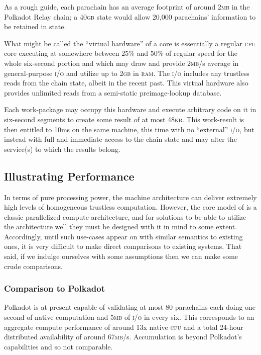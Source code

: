 As a rough guide, each parachain has an average footprint of around 2\textsc{mb} in the Polkadot Relay chain; a 40\textsc{gb} state would allow 20,000 parachains' information to be retained in state.

What might be called the ``virtual hardware'' of a \Jam core is essentially a regular \textsc{cpu} core executing at somewhere between 25\% and 50\% of regular speed for the whole six-second portion and which may draw and provide 2\textsc{mb}/s average in general-purpose \textsc{i/o} and utilize up to 2\textsc{gb} in \textsc{ram}. The \textsc{i/o} includes any trustless reads from the \Jam chain state, albeit in the recent past. This virtual hardware also provides unlimited reads from a semi-static preimage-lookup database.

Each work-package may occupy this hardware and execute arbitrary code on it in six-second segments to create some result of at most 48\textsc{kb}. This work-result is then entitled to 10ms on the same machine, this time with no ``external'' \textsc{i/o}, but instead with full and immediate access to the \Jam chain state and may alter the service(s) to which the results belong.

\subsection{Illustrating Performance}

In terms of pure processing power, the \Jam machine architecture can deliver extremely high levels of homogeneous trustless computation. However, the core model of \Jam is a classic parallelized compute architecture, and for solutions to be able to utilize the architecture well they must be designed with it in mind to some extent. Accordingly, until such use-cases appear on \Jam with similar semantics to existing ones, it is very difficult to make direct comparisons to existing systems. That said, if we indulge ourselves with some assumptions then we can make some crude comparisons.

\subsubsection{Comparison to Polkadot}
Polkadot is at present capable of validating at most 80 parachains each doing one second of native computation and 5\textsc{mb} of \textsc{i/o} in every six. This corresponds to an aggregate compute performance of around 13x native \textsc{cpu} and a total 24-hour distributed availability of around 67\textsc{mb}/s. Accumulation is beyond Polkadot's capabilities and so not comparable.

